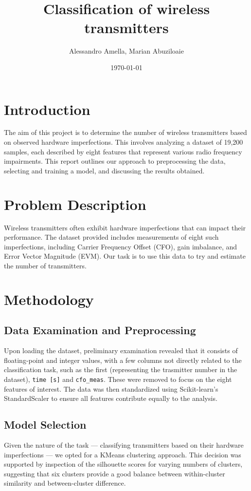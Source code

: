 \documentclass{article}
\title{Classification of wireless transmitters}
\author{Alessandro Amella, Marian Abuziloaie}
\date{\today}
\begin{document}
\maketitle




\section{Introduction}
The aim of this project is to determine the number of wireless transmitters based on observed hardware imperfections. This involves analyzing a dataset of 19,200 samples, each described by eight features that represent various radio frequency impairments. This report outlines our approach to preprocessing the data, selecting and training a model, and discussing the results obtained.

\section{Problem Description}
Wireless transmitters often exhibit hardware imperfections that can impact their performance. The dataset provided includes measurements of eight such imperfections, including Carrier Frequency Offset (CFO), gain imbalance, and Error Vector Magnitude (EVM). Our task is to use this data to try and estimate the number of transmitters.

\section{Methodology}

\subsection{Data Examination and Preprocessing}
Upon loading the dataset, preliminary examination revealed that it consists of floating-point and integer values, with a few columns not directly related to the classification task, such as the first (representing the trasmitter number in the dataset), \texttt{time [s]} and \texttt{cfo\_meas}. These were removed to focus on the eight features of interest. The data was then standardized using Scikit-learn's StandardScaler to ensure all features contribute equally to the analysis.

\subsection{Model Selection}
Given the nature of the task — classifying transmitters based on their hardware imperfections — we opted for a KMeans clustering approach. This decision was supported by inspection of the silhouette scores for varying numbers of clusters, suggesting that six clusters provide a good balance between within-cluster similarity and between-cluster difference.
\end{document}
